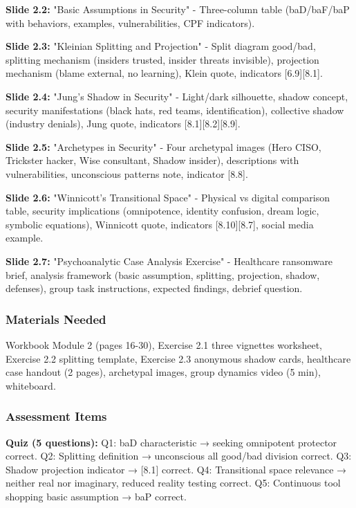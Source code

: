 \documentclass[11pt,a4paper]{article}
\begin{document}
\textbf{Slide 2.2:} "Basic Assumptions in Security" - Three-column table (baD/baF/baP with behaviors, examples, vulnerabilities, CPF indicators).

\textbf{Slide 2.3:} "Kleinian Splitting and Projection" - Split diagram good/bad, splitting mechanism (insiders trusted, insider threats invisible), projection mechanism (blame external, no learning), Klein quote, indicators [6.9][8.1].

\textbf{Slide 2.4:} "Jung's Shadow in Security" - Light/dark silhouette, shadow concept, security manifestations (black hats, red teams, identification), collective shadow (industry denials), Jung quote, indicators [8.1][8.2][8.9].

\textbf{Slide 2.5:} "Archetypes in Security" - Four archetypal images (Hero CISO, Trickster hacker, Wise consultant, Shadow insider), descriptions with vulnerabilities, unconscious patterns note, indicator [8.8].

\textbf{Slide 2.6:} "Winnicott's Transitional Space" - Physical vs digital comparison table, security implications (omnipotence, identity confusion, dream logic, symbolic equations), Winnicott quote, indicators [8.10][8.7], social media example.

\textbf{Slide 2.7:} "Psychoanalytic Case Analysis Exercise" - Healthcare ransomware brief, analysis framework (basic assumption, splitting, projection, shadow, defenses), group task instructions, expected findings, debrief question.

\subsubsection{Materials Needed}
Workbook Module 2 (pages 16-30), Exercise 2.1 three vignettes worksheet, Exercise 2.2 splitting template, Exercise 2.3 anonymous shadow cards, healthcare case handout (2 pages), archetypal images, group dynamics video (5 min), whiteboard.

\subsubsection{Assessment Items}
\textbf{Quiz (5 questions):} Q1: baD characteristic → seeking omnipotent protector correct. Q2: Splitting definition → unconscious all good/bad division correct. Q3: Shadow projection indicator → [8.1] correct. Q4: Transitional space relevance → neither real nor imaginary, reduced reality testing correct. Q5: Continuous tool shopping basic assumption → baP correct.
\end{document}
